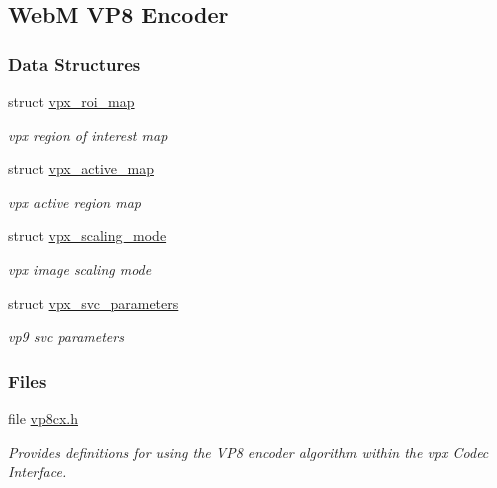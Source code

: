 \hypertarget{group__vp8__encoder}{\subsection{\-Web\-M \-V\-P8 \-Encoder}
\label{group__vp8__encoder}
}
\subsubsection*{\-Data \-Structures}
\begin{DoxyCompactItemize}
\item 
struct \hyperlink{structvpx__roi__map}{vpx\-\_\-roi\-\_\-map}
\begin{DoxyCompactList}\small\item\em vpx region of interest map \end{DoxyCompactList}\item 
struct \hyperlink{structvpx__active__map}{vpx\-\_\-active\-\_\-map}
\begin{DoxyCompactList}\small\item\em vpx active region map \end{DoxyCompactList}\item 
struct \hyperlink{structvpx__scaling__mode}{vpx\-\_\-scaling\-\_\-mode}
\begin{DoxyCompactList}\small\item\em vpx image scaling mode \end{DoxyCompactList}\item 
struct \hyperlink{structvpx__svc__parameters}{vpx\-\_\-svc\-\_\-parameters}
\begin{DoxyCompactList}\small\item\em vp9 svc parameters \end{DoxyCompactList}\end{DoxyCompactItemize}
\subsubsection*{\-Files}
\begin{DoxyCompactItemize}
\item 
file \hyperlink{vp8cx_8h}{vp8cx.\-h}
\begin{DoxyCompactList}\small\item\em \-Provides definitions for using the \-V\-P8 encoder algorithm within the vpx \-Codec \-Interface. \end{DoxyCompactList}\end{DoxyCompactItemize}
